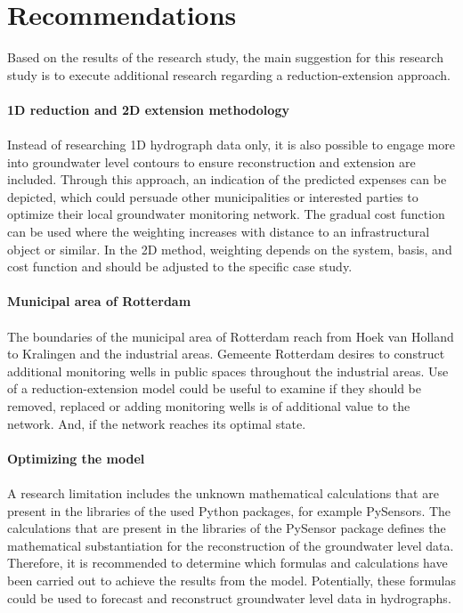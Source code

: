 \chapter{Recommendations}
\label{chapter:recommendations}

Based on the results of the research study, the main suggestion for this research study is to execute additional research regarding a reduction-extension approach.\\
\\

\textbf{1D reduction and 2D extension methodology}\\
\\
Instead of researching 1D hydrograph data only, it is also possible to engage more into groundwater level contours to ensure reconstruction and extension are included. Through this approach, an indication of the predicted expenses can be depicted, which could persuade other municipalities or interested parties to optimize their local groundwater monitoring network. The gradual cost function can be used where the weighting increases with distance to an infrastructural object or similar. In the 2D method, weighting depends on the system, basis, and cost function and should be adjusted to the specific case study. \\
\\
\textbf{Municipal area of Rotterdam}\\
\\
The boundaries of the municipal area of Rotterdam reach from Hoek van Holland to Kralingen and the industrial areas. Gemeente Rotterdam desires to construct additional monitoring wells in public spaces throughout the industrial areas. Use of a reduction-extension model could be useful to examine if they should be removed, replaced or adding monitoring wells is of additional value to the network. And, if the network reaches its optimal state. \\
\\
\textbf{Optimizing the model}\\
\\
A research limitation includes the unknown mathematical calculations that are present in the libraries of the used Python packages, for example PySensors. The calculations that are present in the libraries of the PySensor package defines the mathematical substantiation for the reconstruction of the groundwater level data. Therefore, it is recommended to determine which formulas and calculations have been carried out to achieve the results from the model. Potentially, these formulas could be used to forecast and reconstruct groundwater level data in hydrographs.

